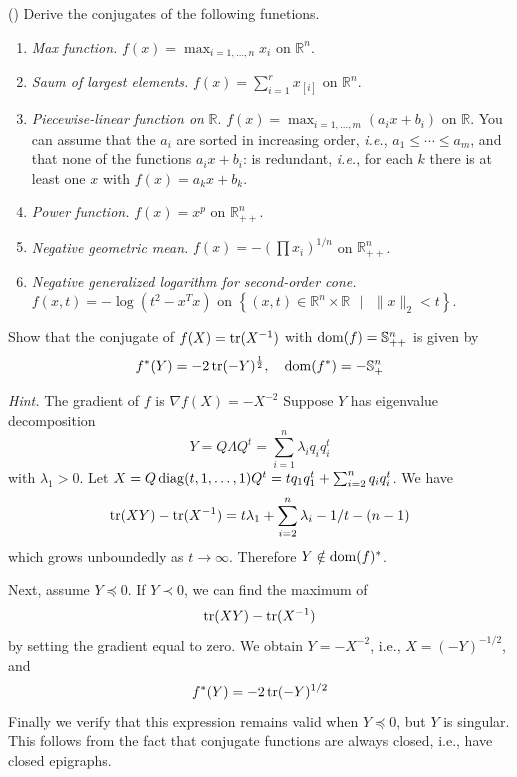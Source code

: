 \myline

\todo

\begin{problem}[3.36]
    (\todo)
    Derive the conjugates of the following funetions.
    \begin{enumerate}
        \item \textit{Max function.} $f(x) = \max_{i = 1,\dots,n}x_i$ on $\mathbb{R}^n$.
        \item \textit{Saum of largest elements.} $f(x) = \sum_{i = 1}^r x_{[i]}$ on $\mathbb{R}^n$.
        \item \textit{Piecewise-linear function on} $\mathbb{R}$. $f(x) = \max_{i = 1, \dots, m}(a_ix + b_i)$ on $\mathbb{R}$. You can assume that the $a_i$ are sorted in increasing order, \textit{i.e.}, $a_1 \le \cdots \le a_m$, and that none of the functions $a_ix + b_i$: is redundant, \textit{i.e.}, for each $k$ there is at least one $x$ with $f(x) = a_kx + b_k$.
        \item \textit{Power function.} $f(x) = x^p$ on $\mathbb{R}_{++}^n$.
        \item \textit{Negative geometric mean.} $f(x) = -\left(\prod x_i\right)^{1 / n}$ on $\mathbb{R}_{++}^n$.
        \item \textit{Negative generalized logarithm for second-order cone.} $f(x, t) = -\log(t^2 - x^Tx)$ on $\left\{(x, t) \in \mathbb{R}^n\times \mathbb{R}\text{\ } |\text{\ } \|x\|_2 < t\right\}$.
    \end{enumerate}
\end{problem}

\begin{problem}[3.37]
    Show that the conjugate of $f(X) = \operatorname{tr}(X^{-1})$ with $\operatorname{dom}(f) = \mathbb{S}^n_{++}$ is given by\[f^*(Y) = -2\operatorname{tr}(-Y)^{\frac{1}{2}}, \quad \operatorname{dom}(f^*) = -\mathbb{S}_+^n\]

    \textit{Hint.} The gradient of $f$ is $\nabla f(X) = -X^{-2}$
    \Answer Suppose $Y$ has eigenvalue decomposition \[Y = Q\Lambda Q^t = \sum_{i = 1}^n \lambda_i q_i q_i^t\] with $\lambda_1 > 0$. Let $X = Q \operatorname{diag}(t, 1, \dots, 1)Q^t = tq_1q_1^t + \sum_{i = 2}^{n}q_iq_i^t$. We have \[\operatorname{tr}(XY) - \operatorname{tr}(X^{-1}) = t\lambda_1 + \sum_{i = 2}^n\lambda_i - 1 / t - (n - 1)\] which grows unboundedly as $t \to \infty$. Therefore $Y \notin \operatorname{dom}(f)^*$.

    Next, assume $Y \preceq 0$. If $Y \prec 0$, we can find the maximum of \[\operatorname{tr}(XY) - \operatorname{tr}(X^{-1})\] by setting the gradient equal to zero. We obtain $Y = -X^{-2}$, i.e., $X = (-Y)^{-1 / 2}$, and \[f^*(Y) = -2\operatorname{tr}(-Y)^{1 / 2}\]Finally we verify that this expression remains valid when $Y \preceq 0$, but $Y$ is singular. This follows from the fact that conjugate functions are always closed, i.e., have closed epigraphs.
\end{problem}

